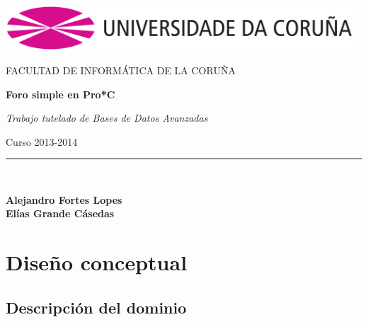 \documentclass[12pt, a4paper, titlepage]{article}
\begin{document}
\begin{titlepage}

\begin{center}

\includegraphics[width=13cm]{./img/logo_UDC.png}
\vspace*{0.5in}

FACULTAD DE INFORMÁTICA DE LA CORUÑA\\
\vspace*{2.5in}

\begin{Large}
\textbf{Foro simple en Pro*C} \\
\end{Large}
\vspace*{0.1in}

\begin{large}
\textit{Trabajo tutelado de Bases de Datos Avanzadas} \\
\end{large}
\vspace*{0.4in}

\begin{large}
Curso 2013-2014
\end{large}
\vspace*{3.4in}


\rule{80mm}{0.1mm}\\
\vspace*{0.25in}

\begin{large}
\textbf{Alejandro Fortes Lopes}\\
\textbf{Elías Grande Cásedas}\\
\end{large}

\end{center}

\end{titlepage}

\tableofcontents

\pagestyle{fancy}

\pagebreak
\section{Diseño conceptual}

\subsection{Descripción del dominio}
\end{document}

